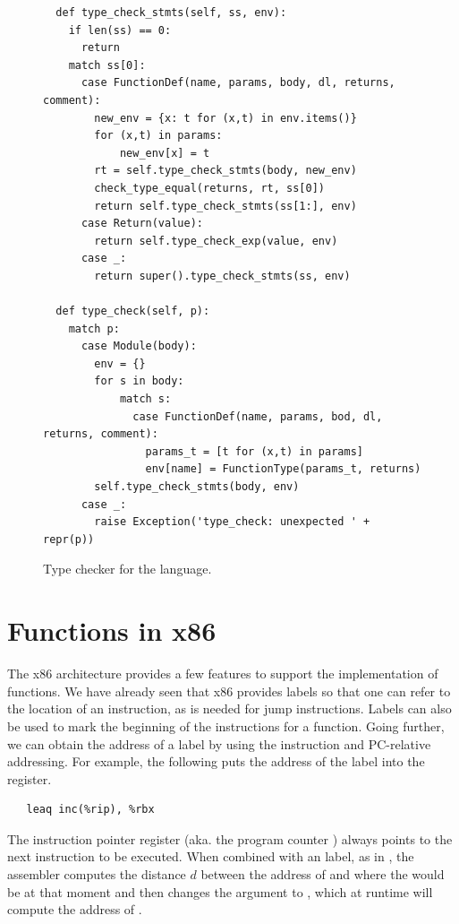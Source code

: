 \documentclass[7x10]{TimesAPriori_MIT}%
\begin{document}
\begin{figure}[tp]
{\begin{lstlisting}
  def type_check_stmts(self, ss, env):
    if len(ss) == 0:
      return
    match ss[0]:
      case FunctionDef(name, params, body, dl, returns, comment):
        new_env = {x: t for (x,t) in env.items()}
        for (x,t) in params:
            new_env[x] = t
        rt = self.type_check_stmts(body, new_env)
        check_type_equal(returns, rt, ss[0])
        return self.type_check_stmts(ss[1:], env)
      case Return(value):
        return self.type_check_exp(value, env)
      case _:
        return super().type_check_stmts(ss, env)

  def type_check(self, p):
    match p:
      case Module(body):
        env = {}
        for s in body:
            match s:
              case FunctionDef(name, params, bod, dl, returns, comment):
                params_t = [t for (x,t) in params]
                env[name] = FunctionType(params_t, returns)
        self.type_check_stmts(body, env)
      case _:
        raise Exception('type_check: unexpected ' + repr(p))
\end{lstlisting}
\fi}
\caption{Type checker for the \LangFun{} language.}
\label{fig:type-check-Rfun}
\end{figure}


\section{Functions in x86}
\label{sec:fun-x86}



The x86 architecture provides a few features to support the
implementation of functions. We have already seen that x86 provides
labels so that one can refer to the location of an instruction, as is
needed for jump instructions. Labels can also be used to mark the
beginning of the instructions for a function.  Going further, we can
obtain the address of a label by using the  instruction and
PC-relative addressing. For example, the following puts the
address of the  label into the  register.
\begin{lstlisting}
   leaq inc(%rip), %rbx
\end{lstlisting}
The instruction pointer register  (aka. the program counter
) always points to the next
instruction to be executed. When combined with an label, as in
, the assembler computes the distance $d$ between the
address of  and where the  would be at that moment
and then changes the  argument to ,
which at runtime will compute the address of .
\end{document}
